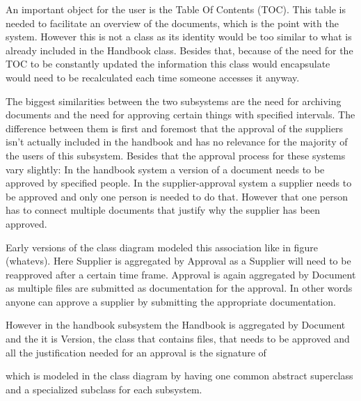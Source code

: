 An important object for the user is the Table Of Contents (TOC). This table is needed to facilitate an overview of the documents, which is the point with the system. However this is not a class as its identity would be too similar to what is already included in the Handbook class. Besides that, because of the need for the TOC to be constantly updated the information this class would encapsulate would need to be recalculated each time someone accesses it anyway.

The biggest similarities between the two subsystems are the need for archiving documents and the need for approving certain things with specified intervals.
The difference between them is first and foremost that the approval of the suppliers isn't actually included in the handbook and has no relevance for the majority of the users of this subsystem. Besides that the approval process for these systems vary slightly:
In the handbook system a version of a document needs to be approved by specified people.
In the supplier-approval system a supplier needs to be approved and only one person is needed to do that.
However that one person has to connect multiple documents that justify why the supplier has been approved.

Early versions of the class diagram modeled this association like in figure (whatevs). Here Supplier is aggregated by Approval as a Supplier will need to be reapproved after a certain time frame. Approval is again aggregated by Document as multiple files are submitted as documentation for the approval. In other words anyone can approve a supplier by submitting the appropriate documentation.

However in the handbook subsystem the Handbook is aggregated by Document and the
it is Version, the class that contains files, that needs to be approved and all the justification needed for an approval is the signature of



 which is modeled in the class diagram by having one common abstract superclass and a specialized subclass for each subsystem.
